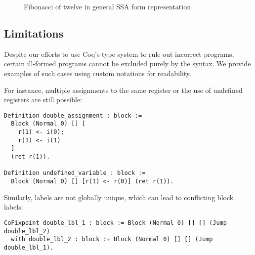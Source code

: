 \begin{figure}[ht]
    \centering
    \caption{Fibonacci of twelve in general SSA form representation}
    \label{fig:example-jair}
\end{figure}

\subsection{Limitations}
\label{subsec:limitations}

Despite our efforts to use Coq's type system to rule out incorrect programs, certain ill-formed programs cannot be excluded purely by the syntax. We provide examples of such cases using custom notations for readability.

For instance, multiple assignments to the same register or the use of undefined registers are still possible:

\begin{lstlisting}[style=Coq]
Definition double_assignment : block :=
  Block (Normal 0) [] [
    r(1) <- i(0);
    r(1) <- i(1)
  ]
  (ret r(1)).

Definition undefined_variable : block :=
  Block (Normal 0) [] [r(1) <- r(0)] (ret r(1)).
\end{lstlisting}

Similarly, labels are not globally unique, which can lead to conflicting block labels:

\begin{lstlisting}[style=Coq]
CoFixpoint double_lbl_1 : block := Block (Normal 0) [] [] (Jump double_lbl_2)
  with double_lbl_2 : block := Block (Normal 0) [] [] (Jump double_lbl_1).
\end{lstlisting}

